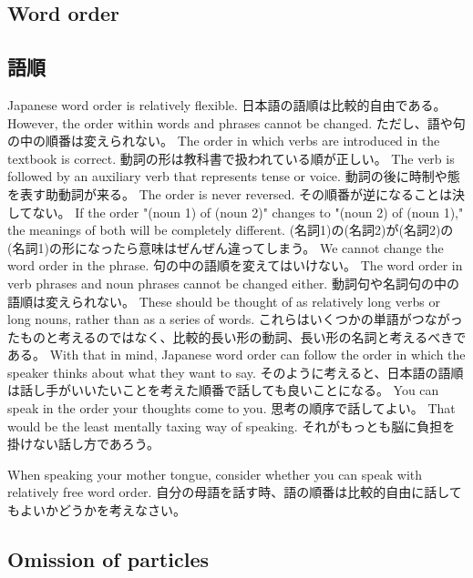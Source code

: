 \documentclass[uplatex,dvipdfmx,b5paper,english,10pt]{jsbook}
\begin{document}
\ifEnglish
\subsection{Word order}
\else
\subsection{語順}
\fi

\ifEnglish
Japanese word order is relatively flexible.
\else
日本語の語順は比較的自由である。
\fi
\ifEnglish
However, the order within words and phrases cannot be changed.
\else
ただし、語や句の中の順番は変えられない。
\fi
\ifEnglish
The order in which verbs are introduced in the textbook is correct.
\else
動詞の形は教科書で扱われている順が正しい。
\fi
\ifEnglish
The verb is followed by an auxiliary verb that represents tense or voice.
\else
動詞の後に時制や態を表す助動詞が来る。
\fi
\ifEnglish
The order is never reversed.
\else
その順番が逆になることは決してない。
\fi
\ifEnglish
If the order "(noun 1) of (noun 2)" changes to "(noun 2) of (noun 1)," the meanings of both will be completely different.
\else
(名詞1)の(名詞2)が(名詞2)の(名詞1)の形になったら意味はぜんぜん違ってしまう。
\fi
\ifEnglish
We cannot change the word order in the phrase.
\else
句の中の語順を変えてはいけない。
\fi
\ifEnglish
The word order in verb phrases and noun phrases cannot be changed either.
\else
動詞句や名詞句の中の語順は変えられない。
\fi
\ifEnglish
These should be thought of as relatively long verbs or long nouns, rather than as a series of words.
\else
これらはいくつかの単語がつながったものと考えるのではなく、比較的長い形の動詞、長い形の名詞と考えるべきである。
\fi
\ifEnglish
With that in mind, Japanese word order can follow the order in which the speaker thinks about what they want to say.
\else
そのように考えると、日本語の語順は話し手がいいたいことを考えた順番で話しても良いことになる。
\fi
\ifEnglish
You can speak in the order your thoughts come to you.
\else
思考の順序で話してよい。
\fi
\ifEnglish
That would be the least mentally taxing way of speaking.
\else
それがもっとも脳に負担を掛けない話し方であろう。
\fi

\begin{toiquestion}
 \ifEnglish
 When speaking your mother tongue, consider whether you can speak with relatively free word order.
 \else
 自分の母語を話す時、語の順番は比較的自由に話してもよいかどうかを考えなさい。
 \fi
\end{toiquestion}

\ifEnglish
\subsection{Omission of particles}
\else
\end{document}
